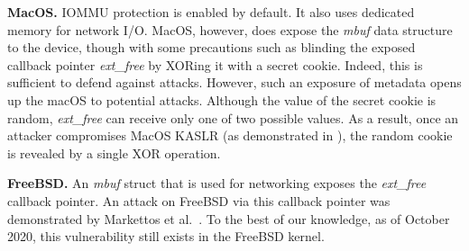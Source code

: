 \smallskip
\noindent\textbf{MacOS.} IOMMU protection is enabled by default. It also uses dedicated memory for network I/O. MacOS, however, does expose the \textit{mbuf} data structure to the device, though with some precautions such as blinding the exposed callback pointer \textit{ext\_free} by XORing it with a secret cookie.
Indeed, this is sufficient to defend against \simple attacks. However, such an exposure of metadata opens up the macOS to potential \compound attacks.
Although the value of the secret cookie is random, \textit{ext\_free} can receive only one of two possible values. As a result, once an attacker compromises MacOS KASLR (as demonstrated in \cite{thunder}), the random cookie is revealed by a single XOR operation.  

\smallskip
\noindent\textbf{FreeBSD.} An \textit{mbuf} struct that is used for networking exposes the \textit{ext\_free} callback pointer. An attack on FreeBSD via this callback pointer was demonstrated by Markettos et al.~\cite{thunder}. To the best of our knowledge, as of October 2020, this vulnerability still exists in the FreeBSD kernel.

